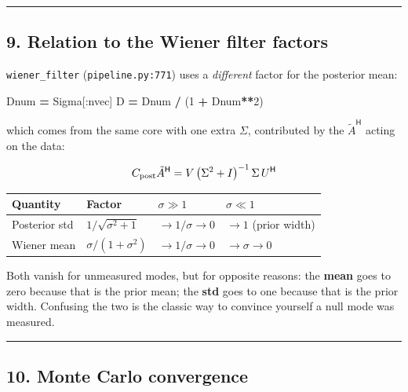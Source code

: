 \documentclass[
  11pt,
]{article}
\newenvironment{Shaded}{\begin{snugshade}}{\end{snugshade}}
\newcommand{\DecValTok}[1]{\textcolor[rgb]{0.00,0.00,0.81}{#1}}
\newcommand{\NormalTok}[1]{#1}
\newcommand{\OperatorTok}[1]{\textcolor[rgb]{0.81,0.36,0.00}{\textbf{#1}}}
\begin{document}
\begin{center}\rule{0.5\linewidth}{0.5pt}\end{center}

\hypertarget{9-relation-to-the-wiener-filter-factors}{%
\subsection{9. Relation to the Wiener filter
factors}\label{9-relation-to-the-wiener-filter-factors}}

\texttt{wiener\_filter} (\texttt{pipeline.py:771}) uses a
\emph{different} factor for the posterior mean:

\begin{Shaded}
\begin{Highlighting}[]
\NormalTok{Dnum }\OperatorTok{=}\NormalTok{ Sigma[:nvec]}
\NormalTok{D }\OperatorTok{=}\NormalTok{ Dnum }\OperatorTok{/}\NormalTok{ (}\DecValTok{1} \OperatorTok{+}\NormalTok{ Dnum}\OperatorTok{**}\DecValTok{2}\NormalTok{)}
\end{Highlighting}
\end{Shaded}

which comes from the same core with one extra \(\Sigma\), contributed by
the \(\tilde{A}^{\mathsf H}\) acting on the data:

\[ C_{\rm post}\tilde{A}^{\mathsf H} = V\left(\Sigma^2+I\right)^{-1}\Sigma\, U^{\mathsf H} \]

\begin{longtable}[]{@{}llll@{}}
\toprule\noalign{}
Quantity & Factor & \(\sigma \gg 1\) & \(\sigma \ll 1\) \\
\midrule\noalign{}
\endhead
\bottomrule\noalign{}
\endlastfoot
Posterior std & \(1/\sqrt{\sigma^2+1}\) & \(\to 1/\sigma \to 0\) &
\(\to 1\) (prior width) \\
Wiener mean & \(\sigma/(1+\sigma^2)\) & \(\to 1/\sigma \to 0\) &
\(\to \sigma \to 0\) \\
\end{longtable}

Both vanish for unmeasured modes, but for opposite reasons: the
\textbf{mean} goes to zero because that is the prior mean; the
\textbf{std} goes to one because that is the prior width. Confusing the
two is the classic way to convince yourself a null mode was measured.

\begin{center}\rule{0.5\linewidth}{0.5pt}\end{center}

\hypertarget{10-monte-carlo-convergence}{%
\subsection{10. Monte Carlo
convergence}\label{10-monte-carlo-convergence}}
\end{document}

